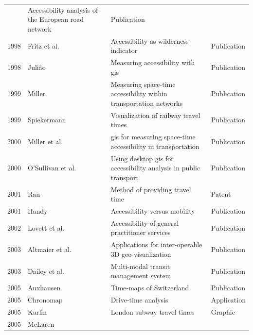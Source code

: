 \begin{table}[htp]
\begin{tabular}{r|l|l|l}
        & Accessibility analysis of the European road network
        & Publication \\
      1998
        & Fritz et al. \cite{fritz1998accessibility}
        & Accessibility as wilderness indicator
        & Publication \\
      1998
        & Juli{\~a}o \cite{juliao1998measuring}
        & Measuring accessibility with \acrshort{gis}
        & Publication \\
      1999
        & Miller \cite{miller1999measuring}
        & Measuring space-time accessibility within transportation networks
        & Publication \\
      1999
        & Spiekermann \cite{spiekermann1999visualisierung}
        & Visualization of railway travel times
        & Publication \\
      2000
        & Miller et al. \cite{miller2000gis}
        & \acrshort{gis} for measuring space-time accessibility in
          transportation
        & Publication \\
      2000
        & O'Sullivan et al. \cite{o2000using}
        & Using desktop \acrshort{gis} for accessibility analysis in public
          transport
        & Publication \\
      2001
        & Ran \cite{ran2001method}
        & Method of providing travel time
        & Patent \\
      2001
        & Handy \cite{handy2002accessibility}
        & Accessibility versus mobility
        & Publication \\
      2002
        & Lovett et al. \cite{lovett2002car}
        & Accessibility of general practitioner services
        & Publication \\
      2003
        & Altmaier et al. \cite{Altmaier2003}
        & Applications for inter-operable 3D geo-visualization
        & Publication \\
      2003
        & Dailey et al. \cite{dailey2003design}
        & Multi-modal transit management system
        & Publication \\
      2005
        & Auxhausen \cite{axhausen2005zeitkarten}
        & Time-maps of Switzerland
        & Publication \\
      2005
        & Chronomap \cite{Chronomap}
        & Drive-time analysis
        & Application \\
      2005
        & Karlin \cite{Karlin2005}
        & London subway travel times
        & Graphic \\
      2005
        & McLaren \cite{McLaren2005}

\end{tabular}
\end{table}
